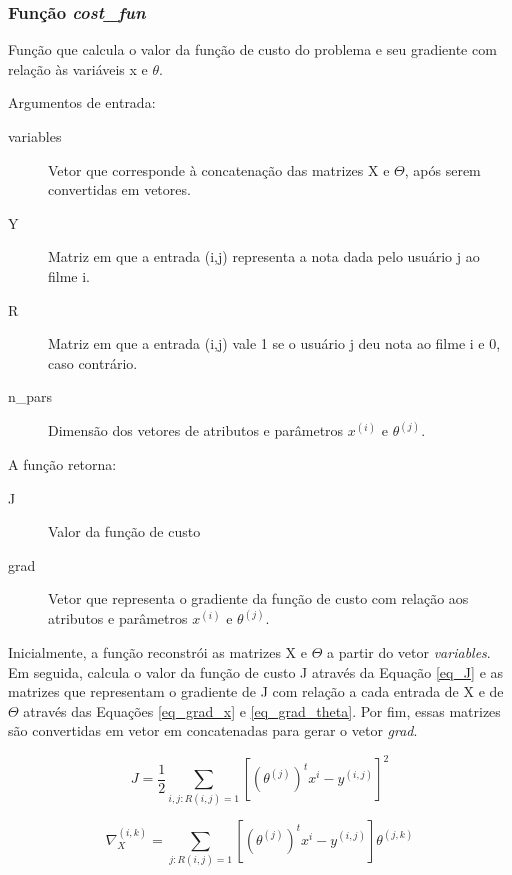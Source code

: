 \documentclass[12pt]{article}
\begin{document}
\subsubsection{Função \textit{cost\_fun}}
Função que calcula o valor da função de custo do problema e seu gradiente com relação às variáveis x e $\theta$.

Argumentos de entrada:

\begin{description}
\item[variables] Vetor que corresponde à concatenação das matrizes X e $\Theta$, após serem convertidas em vetores.
\item[Y] Matriz em que a entrada (i,j) representa a nota dada pelo usuário j ao filme i.
\item[R] Matriz em que a entrada (i,j) vale 1 se o usuário j deu nota ao filme i e 0, caso contrário.
\item[n\_pars] Dimensão dos vetores de atributos e parâmetros $x^{(i)}$ e $\theta^{(j)}$.
\end{description}

A função retorna:

\begin{description}
\item[J] Valor da função de custo
\item[grad] Vetor que representa o gradiente da função de custo com relação aos atributos e parâmetros $x^{(i)}$ e $\theta^{(j)}$.
\end{description}

Inicialmente, a função reconstrói as matrizes X e $\Theta$ a partir do vetor \textit{variables}. Em seguida, calcula o valor da função de custo J através da Equação \ref{eq_J} e as matrizes  que representam o gradiente de J com relação a cada entrada de X e de $\Theta$ através das Equações \ref{eq_grad_x} e \ref{eq_grad_theta}. Por fim, essas matrizes são convertidas em vetor em concatenadas para gerar o vetor \textit{grad}. 

\begin{equation} \label{eq_J}
J = \frac{1}{2} \sum_{i,j: R(i,j) = 1} \left[\left(\theta^{(j)}\right)^t x^i - y^{(i,j)}\right]^2 
\end{equation}

\begin{equation} \label{eq_grad_x}
\nabla_X^{(i,k)} = \sum_{j:R(i,j)=1} \left[\left(\theta^{(j)}\right)^t x^i - y^{(i,j)}\right]\theta^{(j,k)}
\end{equation}
\end{document}

